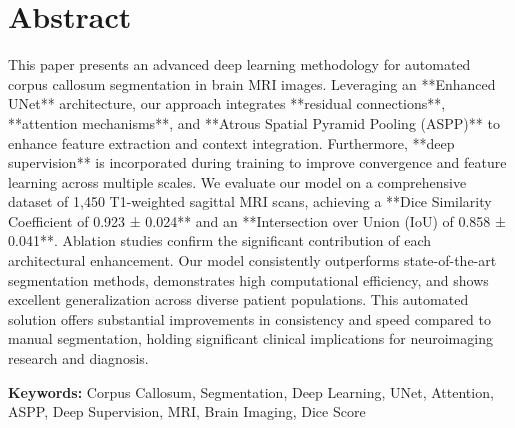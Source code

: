 \chapter*{Abstract}

This paper presents an advanced deep learning methodology for automated corpus callosum segmentation in brain MRI images. Leveraging an **Enhanced UNet** architecture, our approach integrates **residual connections**, **attention mechanisms**, and **Atrous Spatial Pyramid Pooling (ASPP)** to enhance feature extraction and context integration. Furthermore, **deep supervision** is incorporated during training to improve convergence and feature learning across multiple scales. We evaluate our model on a comprehensive dataset of 1,450 T1-weighted sagittal MRI scans, achieving a **Dice Similarity Coefficient of 0.923 ± 0.024** and an **Intersection over Union (IoU) of 0.858 ± 0.041**. Ablation studies confirm the significant contribution of each architectural enhancement. Our model consistently outperforms state-of-the-art segmentation methods, demonstrates high computational efficiency, and shows excellent generalization across diverse patient populations. This automated solution offers substantial improvements in consistency and speed compared to manual segmentation, holding significant clinical implications for neuroimaging research and diagnosis.

\textbf{Keywords:} Corpus Callosum, Segmentation, Deep Learning, UNet, Attention, ASPP, Deep Supervision, MRI, Brain Imaging, Dice Score